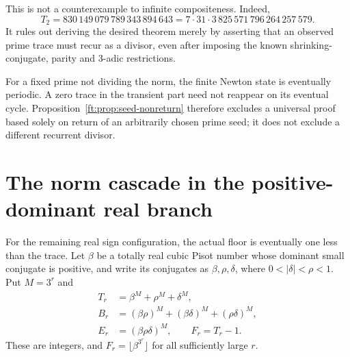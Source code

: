 \documentclass[11pt,a4paper]{article}
\theoremstyle{definition}
\theoremstyle{remark}
\numberwithin{equation}{section}
\begin{document}
This is not a counterexample to infinite compositeness.  Indeed,
\[
 T_2=830\,149\,079\,789\,343\,894\,643
     =7\cdot31\cdot3\,825\,571\,796\,264\,257\,579.
\]
It rules out deriving the desired theorem merely by asserting that
an observed prime trace must recur as a divisor, even after imposing
the known shrinking-conjugate, parity and $3$-adic restrictions.

For a fixed prime not dividing the norm, the finite Newton state is
eventually periodic. A zero trace in the transient part need not reappear
on its eventual cycle. Proposition~\ref{ft:prop:seed-nonreturn} therefore
excludes a universal proof based solely on return of an arbitrarily
chosen prime seed; it does not exclude a different recurrent divisor.

\section{The norm cascade in the positive-dominant real branch}
\label{ft:sec:positive-cascade}

For the remaining real sign configuration, the actual floor is
eventually one less than the trace. Let $\beta$ be a totally real cubic
Pisot number whose dominant small conjugate is positive, and write its
conjugates as $\beta,\rho,\delta$, where
$0<|\delta|<\rho<1$. Put $M=3^r$ and
\[
 \begin{split}
 T_r&=\beta^M+\rho^M+\delta^M,\\
 B_r&=(\beta\rho)^M+(\beta\delta)^M+(\rho\delta)^M,\\
 E_r&=(\beta\rho\delta)^M,\qquad F_r=T_r-1.
 \end{split}
\]
These are integers, and $F_r=\lfloor\beta^{3^r}\rfloor$ for all
sufficiently large $r$.
\end{document}
